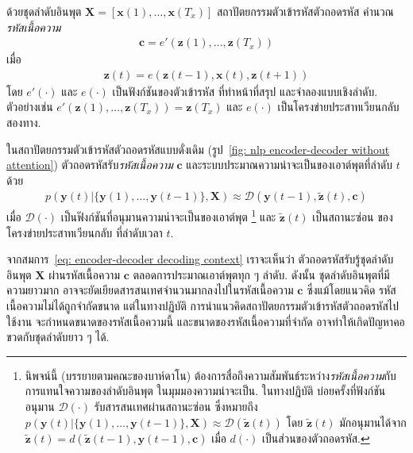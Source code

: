 ด้วยชุดลำดับอินพุต $\bm{X} = [\bm{x}(1), \ldots, \bm{x}(T_x)]$
สถาปัตยกรรมตัวเข้ารหัสตัวถอดรหัส คำนวณ\textit{รหัสเนื้อความ}
\begin{eqnarray}
\bm{c} = e'(\bm{z}(1), \ldots, \bm{z}(T_x))
\label{eq: encoder-decoder encoding context}
\end{eqnarray}
เมื่อ 
\begin{eqnarray}
\bm{z}(t) = e(\bm{z}(t-1), \bm{x}(t), \bm{z}(t+1))
\label{eq: encoder-decoder encoding hidden states}
\end{eqnarray}
โดย $e'(\cdot)$ และ $e(\cdot)$ เป็นฟังก์ชันของตัวเข้ารหัส
ที่ทำหน้าที่สรุป และจำลองแบบเชิงลำดับ.
ตัวอย่างเช่น
$e'(\bm{z}(1), \ldots, \bm{z}(T_x)) = \bm{z}(T_x)$
และ $e(\cdot)$ เป็นโครงข่ายประสาทเวียนกลับสองทาง. 

ในสถาปัตยกรรมตัวเข้ารหัสตัวถอดรหัสแบบดั่งเดิม (รูป~\ref{fig: nlp encoder-decoder without attention})
ตัวถอดรหัสรับ\textit{รหัสเนื้อความ} $\bm{c}$
และระบบประมาณความน่าจะเป็นของเอาต์พุตที่ลำดับ $t$ 
ด้วย 
\begin{eqnarray}
p(\bm{y}(t) | \{\bm{y}(1), \ldots, \bm{y}(t-1)\}, \bm{X}) \approx \mathcal{D}(\bm{y}(t-1), \tilde{\bm{z}}(t), \bm{c})
\label{eq: encoder-decoder decoding context}
\end{eqnarray}
เมื่อ $\mathcal{D}(\cdot)$ เป็นฟังก์ชันที่อนุมานความน่าจะเป็นของเอาต์พุต%
\footnote{%
	นิพจน์นี้ (บรรยายตามคณะของบาห์ดาโน\cite{BahdanauEtAl2015}) ต้องการสื่อถึงความสัมพันธ์ระหว่าง\textit{รหัสเนื้อความ}กับการแทนใจความของลำดับอินพุต
	ในมุมมองความน่าจะเป็น.
	ในทางปฏิบัติ บ่อยครั้งที่ฟังก์ชันอนุมาน $\mathcal{D}(\cdot)$ รับสารสนเทศผ่านสถานะซ่อน
	ซึ่งหมายถึง $p(\bm{y}(t) | \{\bm{y}(1), \ldots, \bm{y}(t-1)\}, \bm{X}) \approx \mathcal{D}(\tilde{\bm{z}}(t))$ 
	โดย $\tilde{\bm{z}}(t)$ มักอนุมานได้จาก $\tilde{\bm{z}}(t) = d(\tilde{\bm{z}}(t-1), \bm{y}(t-1), \bm{c})$
	เมื่อ $d(\cdot)$ เป็นส่วนของตัวถอดรหัส.
}
และ $\tilde{\bm{z}}(t)$ เป็นสถานะซ่อน ของโครงข่ายประสาทเวียนกลับ ที่ลำดับเวลา $t$.

จากสมการ~\ref{eq: encoder-decoder decoding context}
เราจะเห็นว่า
ตัวถอดรหัสรับรู้ชุดลำดับอินพุต $\bm{X}$ ผ่านรหัสเนื้อความ $\bm{c}$
ตลอดการประมาณเอาต์พุตทุก ๆ ลำดับ.
ดังนั้น ชุดลำดับอินพุตที่มีความยาวมาก อาจจะยัดเยียดสารสนเทศจำนวนมากลงไปในรหัสเนื้อความ $\bm{c}$
ซึ่งแม้โดยแนวคิด รหัสเนื้อความไม่ได้ถูกจำกัดขนาด
แต่ในทางปฏิบัติ การนำแนวคิดสถาปัตยกรรมตัวเข้ารหัสตัวถอดรหัสไปใช้งาน จะกำหนดขนาดของรหัสเนื้อความนี้
และขนาดของรหัสเนื้อความที่จำกัด อาจทำให้เกิดปัญหาคอขวดกับชุดลำดับยาว ๆ ได้.

